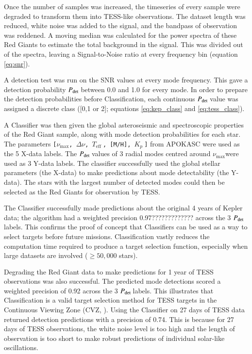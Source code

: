 \documentclass[a4paper,fleqn,usenatbib,useAMS]{mnras}
\newcommand{\numax}{\ensuremath{\nu_{\textrm{max}}}}
\newcommand{\dnu}{\ensuremath{\Delta\nu}}
\newcommand{\teff}{\ensuremath{T_{\textrm{eff}}\:}}
\newcommand{\pdet}{\ensuremath{P_{\rm det}\:}}
\newcommand{\kp}{\ensuremath{K_{p}\:}}
\begin{document}
Once the number of samples was increased, the timeseries of every sample were degraded to transform them into TESS-like observations. The dataset length was reduced, white noise was added to the signal, and the bandpass of observation was reddened. A moving median was calculated for the power spectra of these Red Giants to estimate the total background in the signal. This was divided out of the spectra, leaving a Signal-to-Noise ratio at every frequency bin (equation \ref{eq:snr}).

A detection test was run on the SNR values at every mode frequency. This gave a detection probability \pdet between 0.0 and 1.0 for every mode. In order to prepare the detection probabilities before Classification, each continuous \pdet value was assigned a discrete class ([0,1 or 2]; equations \ref{eq:kep_class} and \ref{eq:tess_class}).

A Classifier was then given the global asteroseismic and spectroscopic properties of the Red Giant sample, along with mode detection probabilities for each star. The parameters \texttt{[\numax, \dnu, \teff, [M/H], \kp]} from APOKASC \citep{pinsonneault_apokasc_2014} were used as the 5 X-data labels. The \pdet values of 3 radial modes centred around \numax were used as 3 Y-data labels. %
The classifier successfully used the global stellar parameters (the X-data) to make predictions about mode detectability (the Y-data). The stars with the largest number of detected modes could then be selected as the Red Giants for observation by TESS. 

The Classifier successfully made predictions about the original 4 years of Kepler data; the algorithm had a weighted precision 0.97????????????? across the 3 \pdet labels. This confirms the proof of concept that Classifiers can be used as a way to select targets before future missions. Classification vastly reduces the computation time required to produce a target selection function, especially when large datasets are involved ($\geq50,000$ stars).

Degrading the Red Giant data to make predictions for 1 year of TESS observations was also successful. The predicted mode detections scored a weighted precision of 0.92 across the 3 \pdet labels. This illustrates that Classification is a valid target selection method for TESS targets in the Continuous Viewing Zone (CVZ, \citep{ricker_transiting_2014}). Using the Classifier on 27 days of TESS data returned detection predictions with a precision of 0.74. This is because for 27 days of TESS observations, the white noise level is too high and the length of observation is too short to make robust predictions of individual solar-like oscillations.
\end{document}
